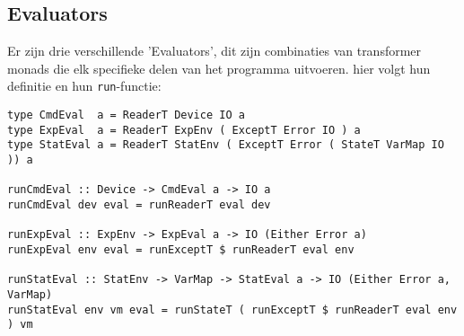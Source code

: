 \documentclass[11pt]{article}
\begin{document}
\subsection{Evaluators}
Er zijn drie verschillende 'Evaluators', dit zijn combinaties van transformer monads die elk specifieke delen van het programma uitvoeren. hier volgt hun definitie en hun \texttt{run}-functie:
\begin{lstlisting}
type CmdEval  a = ReaderT Device IO a
type ExpEval  a = ReaderT ExpEnv ( ExceptT Error IO ) a
type StatEval a = ReaderT StatEnv ( ExceptT Error ( StateT VarMap IO )) a

runCmdEval :: Device -> CmdEval a -> IO a
runCmdEval dev eval = runReaderT eval dev

runExpEval :: ExpEnv -> ExpEval a -> IO (Either Error a)
runExpEval env eval = runExceptT $ runReaderT eval env

runStatEval :: StatEnv -> VarMap -> StatEval a -> IO (Either Error a, VarMap)
runStatEval env vm eval = runStateT ( runExceptT $ runReaderT eval env ) vm\end{lstlisting}
\end{document}

